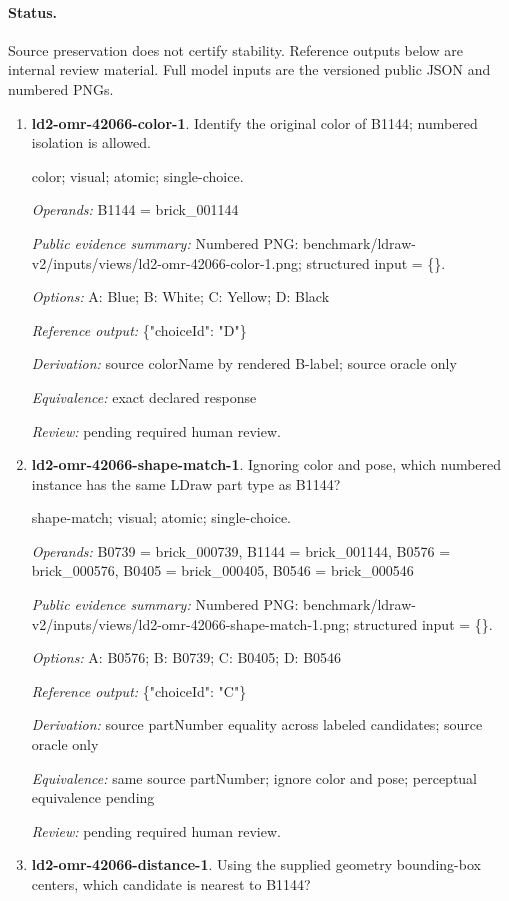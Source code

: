 \paragraph{Status.}Source preservation does not certify stability. Reference outputs below are internal review material. Full model inputs are the versioned public JSON and numbered PNGs.
\begin{enumerate}
\item \textbf{ld2-omr-42066-color-1}. Identify the original color of B1144; numbered isolation is allowed.
\par{\small color; visual; atomic; single-choice.\par\textit{Operands:} B1144 = brick\_001144\par\textit{Public evidence summary:} Numbered PNG: benchmark/ldraw-v2/inputs/views/ld2-omr-42066-color-1.png; structured input = \{\}.\par\textit{Options:} A: Blue; B: White; C: Yellow; D: Black\par\textit{Reference output:} \{"choiceId": "D"\}\par\textit{Derivation:} source colorName by rendered B-label; source oracle only\par\textit{Equivalence:} exact declared response\par\textit{Review:} pending required human review.}
\item \textbf{ld2-omr-42066-shape-match-1}. Ignoring color and pose, which numbered instance has the same LDraw part type as B1144?
\par{\small shape-match; visual; atomic; single-choice.\par\textit{Operands:} B0739 = brick\_000739, B1144 = brick\_001144, B0576 = brick\_000576, B0405 = brick\_000405, B0546 = brick\_000546\par\textit{Public evidence summary:} Numbered PNG: benchmark/ldraw-v2/inputs/views/ld2-omr-42066-shape-match-1.png; structured input = \{\}.\par\textit{Options:} A: B0576; B: B0739; C: B0405; D: B0546\par\textit{Reference output:} \{"choiceId": "C"\}\par\textit{Derivation:} source partNumber equality across labeled candidates; source oracle only\par\textit{Equivalence:} same source partNumber; ignore color and pose; perceptual equivalence pending\par\textit{Review:} pending required human review.}
\item \textbf{ld2-omr-42066-distance-1}. Using the supplied geometry bounding-box centers, which candidate is nearest to B1144?

\end{enumerate}
